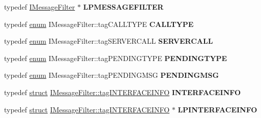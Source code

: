 \begin{DoxyCompactItemize}
typedef \hyperlink{interface_i_message_filter}{I\+Message\+Filter} $\ast$ {\bfseries L\+P\+M\+E\+S\+S\+A\+G\+E\+F\+I\+L\+T\+ER}
\item 
\mbox{\label{interface_i_message_filter_a96fa3cf0aa3fea8ab2626442ee9ed5d4}} 
typedef \hyperlink{interfaceenum}{enum} I\+Message\+Filter\+::tag\+C\+A\+L\+L\+T\+Y\+PE {\bfseries C\+A\+L\+L\+T\+Y\+PE}
\item 
\mbox{\label{interface_i_message_filter_a61a94ecd6fe9c668fb7b99470a972809}} 
typedef \hyperlink{interfaceenum}{enum} I\+Message\+Filter\+::tag\+S\+E\+R\+V\+E\+R\+C\+A\+LL {\bfseries S\+E\+R\+V\+E\+R\+C\+A\+LL}
\item 
\mbox{\label{interface_i_message_filter_aa43a704da7988d57a7c9ed5ff07fc2ec}} 
typedef \hyperlink{interfaceenum}{enum} I\+Message\+Filter\+::tag\+P\+E\+N\+D\+I\+N\+G\+T\+Y\+PE {\bfseries P\+E\+N\+D\+I\+N\+G\+T\+Y\+PE}
\item 
\mbox{\label{interface_i_message_filter_a752473f61f4e19f74d064bc153f52080}} 
typedef \hyperlink{interfaceenum}{enum} I\+Message\+Filter\+::tag\+P\+E\+N\+D\+I\+N\+G\+M\+SG {\bfseries P\+E\+N\+D\+I\+N\+G\+M\+SG}
\item 
\mbox{\label{interface_i_message_filter_ae5a6fe5fcd336bb260873a0368ddf491}} 
typedef \hyperlink{interfacestruct}{struct} \hyperlink{struct_i_message_filter_1_1tag_i_n_t_e_r_f_a_c_e_i_n_f_o}{I\+Message\+Filter\+::tag\+I\+N\+T\+E\+R\+F\+A\+C\+E\+I\+N\+FO} {\bfseries I\+N\+T\+E\+R\+F\+A\+C\+E\+I\+N\+FO}
\item 
\mbox{\label{interface_i_message_filter_a506edfb13dde057195860a34be45c0b2}} 
typedef \hyperlink{interfacestruct}{struct} \hyperlink{struct_i_message_filter_1_1tag_i_n_t_e_r_f_a_c_e_i_n_f_o}{I\+Message\+Filter\+::tag\+I\+N\+T\+E\+R\+F\+A\+C\+E\+I\+N\+FO} $\ast$ {\bfseries L\+P\+I\+N\+T\+E\+R\+F\+A\+C\+E\+I\+N\+FO}
\end{DoxyCompactItemize}
